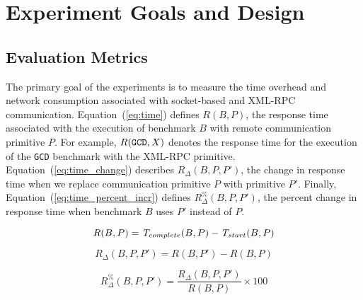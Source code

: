 \documentclass{sig-alternate}
\begin{document}
\section{Experiment Goals and Design}
\label{sec:exper-goals-design}

\subsection{Evaluation Metrics}
\label{sec:evmet}




The primary goal of the experiments is to measure the time overhead
and network consumption associated with socket-based and XML-RPC
communication.  Equation~(\ref{eq:time}) defines $R(B,P)$, the
response time associated with the execution of benchmark $B$ with
remote communication primitive $P$.  For example, $R(\mbox{{\tt GCD}},
X)$ denotes the response time for the execution of the {\tt GCD}
benchmark with the XML-RPC primitive.  Equation~(\ref{eq:time_change})
describes $R_\Delta (B,P,P')$, the change in response time when we
replace communication primitive $P$ with primitive $P'$.  Finally,
Equation~(\ref{eq:time_percent_incr}) defines {\small
  $R_\Delta^\%(B,P,P')$}, the percent change in response time when
benchmark $B$ uses $P'$ instead of $P$.

\vspace*{-.1in}

\begin{equation} \label{eq:time}
R(B,P) = \mbox{{\em T}}_{complete}(B,P) - \mbox{{\em T}}_{start}(B,P)
\end{equation}

\vspace*{-.1in}

\begin{equation} \label{eq:time_change}
R_\Delta (B,P,P') = R(B,P') - R(B,P)
\end{equation}

\vspace*{-.1in}

\begin{equation} \label{eq:time_percent_incr}
R_\Delta^\%(B,P,P')  = \frac{R_\Delta (B,P,P')}{R(B,P)} \times 100
\end{equation}
\end{document}

